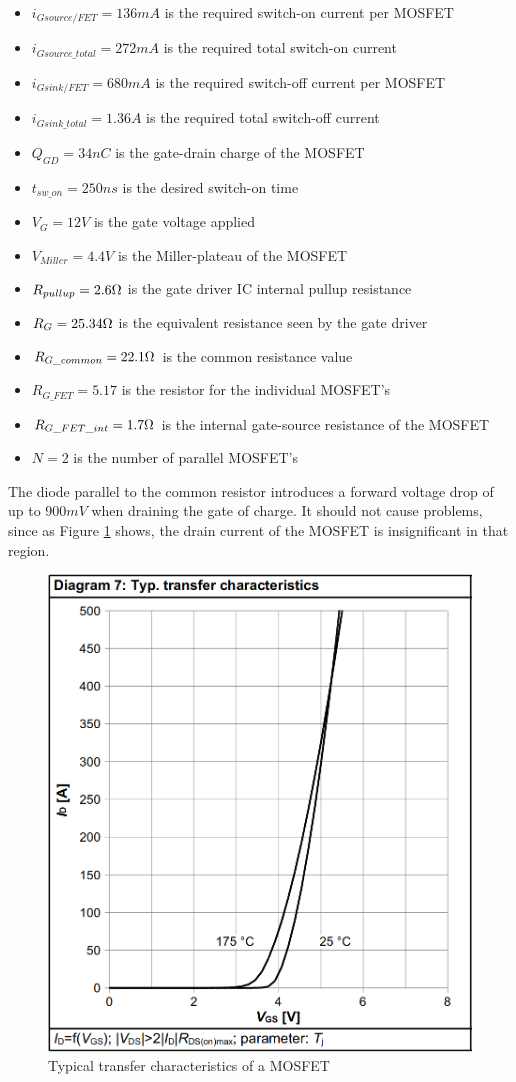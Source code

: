     \begin{itemize}
        \item $i_{Gsource/FET} = 136 mA$ is the required switch-on current per MOSFET
        \item $i_{Gsource{\_}total} = 272 mA$ is the required total switch-on current
        \item $i_{Gsink/FET} = 680 mA$ is the required switch-off current per MOSFET
        \item $i_{Gsink{\_}total} = 1.36 A$ is the required total switch-off current
        \item $Q_{GD} = 34 nC$ is the gate-drain charge of the MOSFET
        \item $t_{sw{\_}on} = 250 ns$ is the desired switch-on time
        \item $V_G = 12V$ is the gate voltage applied
        \item $V_{Miller} = 4.4 V$ is the Miller-plateau of the MOSFET
        \item $R_{pullup} = 2.6 \ohm$ is the gate driver IC internal pullup resistance
        \item $R_G = 25.34 \ohm$ is the equivalent resistance seen by the gate driver
        \item $R_{G{\_}common} = 22.1 \ohm$ is the common resistance value
        \item $R_{G{\_}FET} = 5.17$ is the resistor for the individual MOSFET's
        \item $R_{G{\_}FET{\_}int} = 1.7 \ohm$ is the internal gate-source resistance of the MOSFET
        \item $N = 2$ is the number of parallel MOSFET's
    \end{itemize}
    
    The diode parallel to the common resistor introduces a forward voltage drop of up to $900 mV$ when draining the gate of charge. It should not cause problems, since as Figure \ref{fig:mosfet_transfer_char} shows, the drain current of the MOSFET is insignificant in that region.
    
\begin{figure}[H]
	\centering
	\includegraphics[width=0.6\linewidth]{pictures/hardware/Driver_Board/mosfet_transfer_char.png}
	\caption{Typical transfer characteristics of a MOSFET}
	\label{fig:mosfet_transfer_char}
\end{figure}